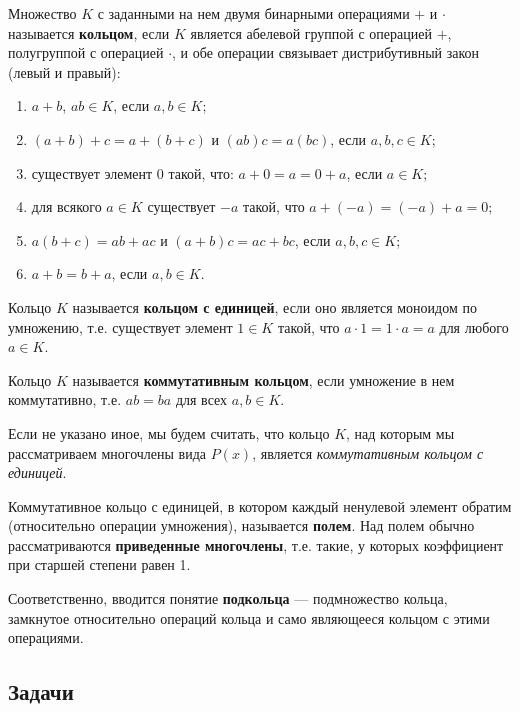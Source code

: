 Множество $K$ с заданными на нем двумя бинарными операциями $+$ и $\cdot$ называется \textbf{кольцом}, если $K$ является абелевой группой с операцией $+$, полугруппой с операцией $\cdot$, и обе операции связывает дистрибутивный закон (левый и правый):
\begin{enumerate}
\item $a+b$, $ab\in K$, если $a,b\in K$;
\item $(a+b)+c=a+(b+c)$ и $(ab)c=a(bc)$, если $a,b,c\in K$;
\item существует элемент $0$ такой, что: $a+0=a=0+a$, если $a\in K$;
\item для всякого $a\in K$ существует $-a$ такой, что $a+(-a)=(-a)+a=0$;
\item $a(b+c)=ab+ac$ и $(a+b)c=ac+bc$, если $a,b,c\in K$;
\item $a+b=b+a$, если $a,b\in K$.
\end{enumerate}

Кольцо $K$ называется \textbf{кольцом с единицей}, если оно является моноидом по умножению, т.е. существует элемент $1\in K$ такой, что $a\cdot 1=1\cdot a=a$ для любого $a\in K$. 

Кольцо $K$ называется \textbf{коммутативным кольцом}, если умножение в нем коммутативно, т.е. $ab=ba$ для всех $a,b\in K$.

Если не указано иное, мы будем считать, что кольцо $K$, над которым мы рассматриваем многочлены вида $P(x)$, является \textit{коммутативным кольцом с единицей}.

Коммутативное кольцо с единицей, в котором каждый ненулевой элемент обратим (относительно операции умножения), называется \textbf{полем}. Над полем обычно рассматриваются \textbf{приведенные многочлены}, т.е. такие, у которых коэффициент при старшей степени равен 1.

Соответственно, вводится понятие \textbf{подкольца} --- подмножество кольца, замкнутое относительно операций кольца и само являющееся кольцом с этими операциями.


\subsection*{Задачи}


